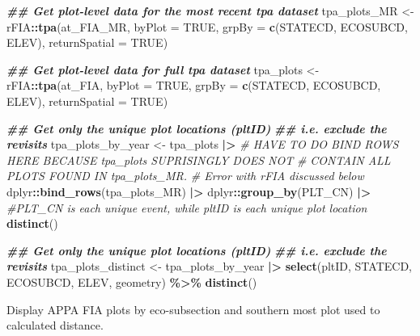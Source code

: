 \documentclass[
]{book}
\newenvironment{Shaded}{\begin{snugshade}}{\end{snugshade}}
\newcommand{\AttributeTok}[1]{\textcolor[rgb]{0.13,0.29,0.53}{#1}}
\newcommand{\CommentTok}[1]{\textcolor[rgb]{0.56,0.35,0.01}{\textit{#1}}}
\newcommand{\ConstantTok}[1]{\textcolor[rgb]{0.56,0.35,0.01}{#1}}
\newcommand{\DocumentationTok}[1]{\textcolor[rgb]{0.56,0.35,0.01}{\textbf{\textit{#1}}}}
\newcommand{\FunctionTok}[1]{\textcolor[rgb]{0.13,0.29,0.53}{\textbf{#1}}}
\newcommand{\NormalTok}[1]{#1}
\newcommand{\OtherTok}[1]{\textcolor[rgb]{0.56,0.35,0.01}{#1}}
\newcommand{\SpecialCharTok}[1]{\textcolor[rgb]{0.81,0.36,0.00}{\textbf{#1}}}
\begin{document}
\begin{Shaded}
\begin{Highlighting}[]
\DocumentationTok{\#\# Get plot{-}level data for the most recent tpa dataset}
\NormalTok{tpa\_plots\_MR }\OtherTok{\textless{}{-}}\NormalTok{ rFIA}\SpecialCharTok{::}\FunctionTok{tpa}\NormalTok{(at\_FIA\_MR, }
                          \AttributeTok{byPlot =} \ConstantTok{TRUE}\NormalTok{, }
                          \AttributeTok{grpBy =} \FunctionTok{c}\NormalTok{(STATECD, ECOSUBCD, ELEV),}
                          \AttributeTok{returnSpatial =} \ConstantTok{TRUE}\NormalTok{) }

\DocumentationTok{\#\# Get plot{-}level data for full tpa dataset  }
\NormalTok{tpa\_plots }\OtherTok{\textless{}{-}}\NormalTok{ rFIA}\SpecialCharTok{::}\FunctionTok{tpa}\NormalTok{(at\_FIA, }
                       \AttributeTok{byPlot =} \ConstantTok{TRUE}\NormalTok{, }
                       \AttributeTok{grpBy =} \FunctionTok{c}\NormalTok{(STATECD, ECOSUBCD, ELEV),}
                       \AttributeTok{returnSpatial =} \ConstantTok{TRUE}\NormalTok{) }

\DocumentationTok{\#\# Get only the unique plot locations (pltID)}
\DocumentationTok{\#\# i.e. exclude the revisits }
\NormalTok{tpa\_plots\_by\_year }\OtherTok{\textless{}{-}}\NormalTok{ tpa\_plots }\SpecialCharTok{|\textgreater{}}
  \CommentTok{\# HAVE TO DO BIND ROWS HERE BECAUSE \textasciigrave{}tpa\_plots\textquotesingle{} SUPRISINGLY DOES NOT }
  \CommentTok{\# CONTAIN ALL PLOTS FOUND IN \textasciigrave{}tpa\_plots\_MR\textquotesingle{}.}
  \CommentTok{\# Error with rFIA discussed below}
\NormalTok{  dplyr}\SpecialCharTok{::}\FunctionTok{bind\_rows}\NormalTok{(tpa\_plots\_MR) }\SpecialCharTok{|\textgreater{}}
\NormalTok{  dplyr}\SpecialCharTok{::}\FunctionTok{group\_by}\NormalTok{(PLT\_CN) }\SpecialCharTok{|\textgreater{}} \CommentTok{\#PLT\_CN is each unique event, while pltID is each unique plot location}
  \FunctionTok{distinct}\NormalTok{()}

\DocumentationTok{\#\# Get only the unique plot locations (pltID)}
\DocumentationTok{\#\# i.e. exclude the revisits }
\NormalTok{tpa\_plots\_distinct }\OtherTok{\textless{}{-}}\NormalTok{ tpa\_plots\_by\_year }\SpecialCharTok{|\textgreater{}}
  \FunctionTok{select}\NormalTok{(pltID, STATECD, ECOSUBCD, ELEV, geometry) }\SpecialCharTok{\%\textgreater{}\%}
  \FunctionTok{distinct}\NormalTok{()}
\end{Highlighting}
\end{Shaded}

Display APPA FIA plots by eco-subsection and southern most plot used to calculated distance.
\end{document}
